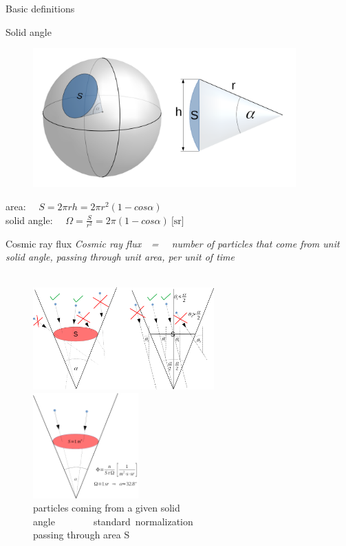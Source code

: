 \documentclass{beamer}
\begin{document}
\begin{frame}
\vfill
\centering
\Huge{Basic definitions}

\vfill
\end{frame}

\begin{frame}{Solid angle}
\begin{figure}
\includegraphics[width=0.9\textwidth]{images/solid_angle.png}%
\end{figure}
\centering
area: ~~$S= 2 \pi r h = 2 \pi r^2 (1-cos \alpha)$\\
solid angle: ~~$\Omega= \frac{S}{r^2}=2 \pi (1-cos \alpha) ~ \text{[sr]}$
\end{frame}

\begin{frame}{Cosmic ray flux}
\centering
\emph{ Cosmic ray flux~~=~~ number of particles that come from unit solid angle, passing through unit area, per unit of time}
~\\~\\

\begin{figure}
\includegraphics[width=0.62\textwidth]{images/steradianDef.png}~
\includegraphics[width=0.36\textwidth]{images/steradian_normalization.png}\\
particles coming from a given solid angle~~~~~~~~standard~normalization~~~~\\
passing through area S~~~~~~~~~~~~~~~~~~~~~~~~~~~~~~~~~~~~~
\end{figure}
\end{frame}
\end{document}
